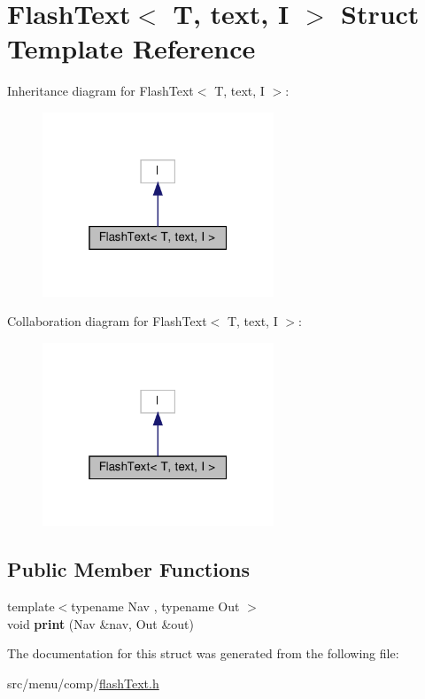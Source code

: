 \hypertarget{structFlashText}{}\section{Flash\+Text$<$ T, text, I $>$ Struct Template Reference}
\label{structFlashText}


Inheritance diagram for Flash\+Text$<$ T, text, I $>$\+:\nopagebreak
\begin{figure}[H]
\begin{center}
\leavevmode
\includegraphics[width=196pt]{structFlashText__inherit__graph}
\end{center}
\end{figure}


Collaboration diagram for Flash\+Text$<$ T, text, I $>$\+:\nopagebreak
\begin{figure}[H]
\begin{center}
\leavevmode
\includegraphics[width=196pt]{structFlashText__coll__graph}
\end{center}
\end{figure}
\subsection*{Public Member Functions}
\begin{DoxyCompactItemize}
\item 
\mbox{\label{structFlashText_a39c3adbea36ed827bb9b827c6f5c6a93}} 
{\footnotesize template$<$typename Nav , typename Out $>$ }\\void {\bfseries print} (Nav \&nav, Out \&out)
\end{DoxyCompactItemize}


The documentation for this struct was generated from the following file\+:\begin{DoxyCompactItemize}
\item 
src/menu/comp/\hyperlink{flashText_8h}{flash\+Text.\+h}\end{DoxyCompactItemize}
